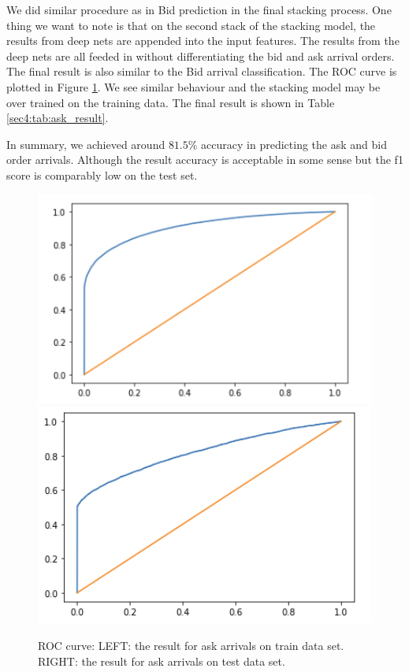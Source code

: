 \documentclass[letterpaper,12pt]{article}
\numberwithin{equation}{section}
\begin{document}
We did similar procedure as in Bid prediction in the final stacking process. One thing we want to note is that on the second stack of the stacking model, the results from deep nets are appended into the input features. The results from the deep nets are all feeded in without differentiating the bid and ask arrival orders. The final result is also similar to the Bid arrival classification. The ROC curve is plotted in Figure \ref{sec4:fig:ROC_ask}. We see similar behaviour and the stacking model may be over trained on the training data. The final result is shown in Table \ref{sec4:tab:ask_result}. 

In summary, we achieved around $81.5\%$ accuracy in predicting the ask and bid order arrivals. Although the result accuracy is acceptable in some sense but the f1 score is comparably low on the test set. 
\begin{figure}
    \centering
    \includegraphics[scale=0.45]{figs/ROC_ask_train.png}
    \includegraphics[scale=0.45]{figs/ROC_ask_test.png}
    \caption{\small ROC curve: LEFT: the result for ask arrivals on train data set. RIGHT: the result for ask arrivals on test data set.}
    \label{sec4:fig:ROC_ask}
\end{figure}
\end{document}
